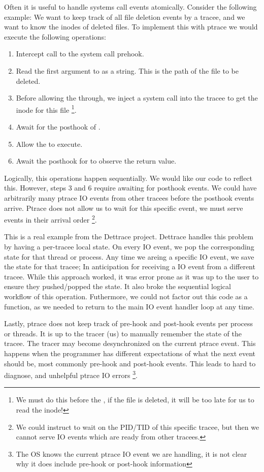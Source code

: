 \begin{compactitem}
    Often it is useful to handle systems call events atomically. Consider the following example: We want to keep track of all file deletion events by a tracee, and we want to know the inodes of deleted files. To implement this with ptrace we would execute the following operations:
    \begin{enumerate}
    \item Intercept call to the  system call prehook.
    \item Read the first argument to  as a string. This is the path of the file to be deleted.
    \item Before allowing the  through, we inject a  system call into the tracee to get the inode for this file \footnote{We must do this before the , if the file is deleted, it will be too late for us to read the inode!}.
    \item Await for the posthook of .
    \item Allow the  to execute.
    \item Await the posthook for  to observe the return value.
    \end{enumerate}
    
    Logically, this operations happen sequentially. We would like our code to reflect this. However, steps 3 and 6 require awaiting for posthook events. We could have arbitrarily many ptrace IO events from other tracees before the posthook events arrive. Ptrace does not allow us to wait for this specific event, we must serve events in their arrival order \footnote{We could instruct  to wait on the PID/TID of this specific tracee, but then we cannot serve IO events which are ready from other tracees.}.
    
    This is a real example from the Dettrace project. Dettrace handles this problem by having a per-tracee local state. On every IO event, we pop the corresponding state for that thread or process. Any time we areing a specific IO event, we save the state for that tracee; In anticipation for receiving a IO event from a different tracee. While this approach worked, it was error prone as it was up to the user to ensure they pushed/popped the state. It also broke the sequential logical workflow of this operation. Futhermore, we could not factor out this code as a function, as we needed to return to the main IO event handler loop at any time.
    
    Lastly, ptrace does not keep track of pre-hook and post-hook events per process or threads. It is up to the tracer (us) to manually remember the state of the tracee. The tracer may become desynchronized on the current ptrace event. This happens when the programmer has different expectations of what the next event should be, most commonly pre-hook and post-hook events. This leads to hard to diagnose, and unhelpful  ptrace IO errors \footnote{The OS knows the current ptrace IO event we are handling, it is not clear why it does include pre-hook or post-hook information}.


\end{compactitem}
